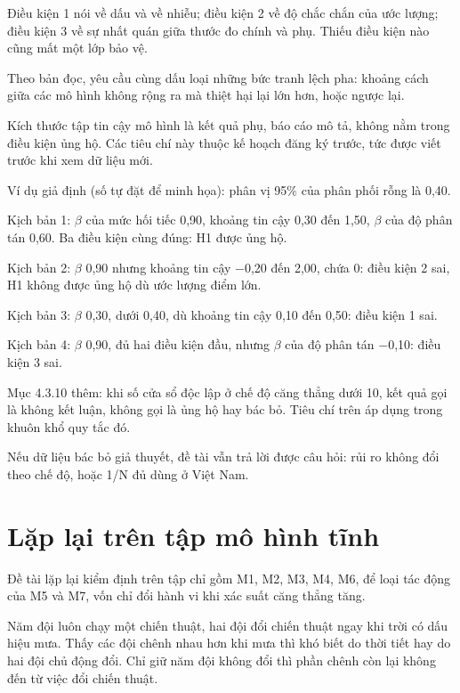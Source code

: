Điều kiện 1 nói về dấu và về nhiễu; điều kiện 2 về độ chắc chắn của ước lượng; điều kiện 3 về sự nhất quán giữa thước đo chính và phụ. Thiếu điều kiện nào cũng mất một lớp bảo vệ.

Theo bản đọc, yêu cầu cùng dấu loại những bức tranh lệch pha: khoảng cách giữa các mô hình không rộng ra mà thiệt hại lại lớn hơn, hoặc ngược lại.

Kích thước tập tin cậy mô hình là kết quả phụ, báo cáo mô tả, không nằm trong điều kiện ủng hộ. Các tiêu chí này thuộc kế hoạch đăng ký trước, tức được viết trước khi xem dữ liệu mới.

\begin{tcolorbox}[breakable]
Ví dụ giả định (số tự đặt để minh họa): phân vị 95\% của phân phối rỗng là 0,40.

Kịch bản 1: \texorpdfstring{$\beta$}{beta} của mức hối tiếc 0,90, khoảng tin cậy 0,30 đến 1,50, \texorpdfstring{$\beta$}{beta} của độ phân tán 0,60. Ba điều kiện cùng đúng: H1 được ủng hộ.

Kịch bản 2: \texorpdfstring{$\beta$}{beta} 0,90 nhưng khoảng tin cậy −0,20 đến 2,00, chứa 0: điều kiện 2 sai, H1 không được ủng hộ dù ước lượng điểm lớn.

Kịch bản 3: \texorpdfstring{$\beta$}{beta} 0,30, dưới 0,40, dù khoảng tin cậy 0,10 đến 0,50: điều kiện 1 sai.

Kịch bản 4: \texorpdfstring{$\beta$}{beta} 0,90, đủ hai điều kiện đầu, nhưng \texorpdfstring{$\beta$}{beta} của độ phân tán −0,10: điều kiện 3 sai.
\end{tcolorbox}

Mục 4.3.10 thêm: khi số cửa sổ độc lập ở chế độ căng thẳng dưới 10, kết quả gọi là không kết luận, không gọi là ủng hộ hay bác bỏ. Tiêu chí trên áp dụng trong khuôn khổ quy tắc đó.

Nếu dữ liệu bác bỏ giả thuyết, đề tài vẫn trả lời được câu hỏi: rủi ro không đổi theo chế độ, hoặc 1/N đủ dùng ở Việt Nam.

\section{Lặp lại trên tập mô hình tĩnh}

Đề tài lặp lại kiểm định trên tập chỉ gồm M1, M2, M3, M4, M6, để loại tác động của M5 và M7, vốn chỉ đổi hành vi khi xác suất căng thẳng tăng.

Năm đội luôn chạy một chiến thuật, hai đội đổi chiến thuật ngay khi trời có dấu hiệu mưa. Thấy các đội chênh nhau hơn khi mưa thì khó biết do thời tiết hay do hai đội chủ động đổi. Chỉ giữ năm đội không đổi thì phần chênh còn lại không đến từ việc đổi chiến thuật.

